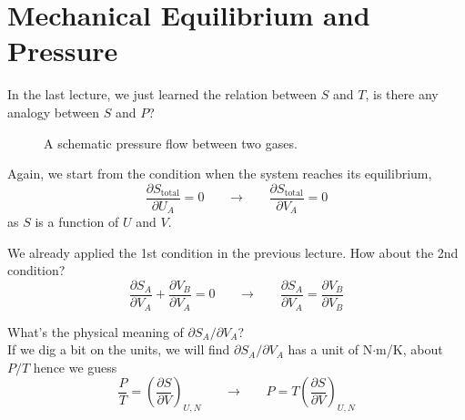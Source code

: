 


\section{Mechanical Equilibrium and Pressure}
In the last lecture, we just learned the relation between $S$ and $T$, is there any analogy between $S$ and $P$?

\begin{figure}[h]
\centering
{}
\caption{A schematic pressure flow between two gases.}
\end{figure}

Again, we start from the condition when the system reaches its equilibrium,
\begin{equation} \label{entropy} 
\frac {\partial{S_\text{total}}} {\partial{U_A}}=0     ~~~~~~~~ \rightarrow~~~~~~~~  \frac {\partial{S_\text{total}}} {\partial{V_A}}=0
\end{equation}
as $S$ is a function of $U$ and $V$.

We already applied the 1st condition in the previous lecture. How about the 2nd condition? 
\begin{equation} \label{entropy} 
\frac {\partial{S_A}} {\partial{V_A}} +  \frac {\partial{V_B}} {\partial{V_A}} =0     ~~~~~~~~ \rightarrow~~~~~~~~  
\frac {\partial{S_A}} {\partial{V_A}} =  \frac {\partial{V_B}} {\partial{V_B}} 
\end{equation}

What's the physical meaning of $\partial{S_A}/\partial{V_A}$? \\
If we dig a bit on the units, we will find $\partial{S_A}/\partial{V_A}$ has a unit of N$\cdot$m/K, about $P/T$ hence we guess
\begin{equation} \label{entropy} 
\frac {P}{T} =  (\frac {\partial{S}} {\partial{V}})_{U,N}     ~~~~~~~~ \rightarrow~~~~~~~~  
P = T (\frac {\partial{S}} {\partial{V}})_{U,N}
\end{equation}

